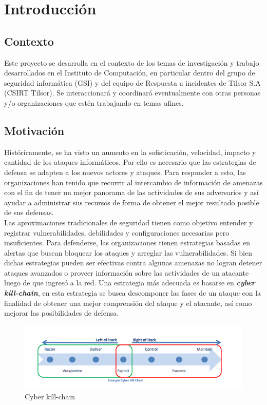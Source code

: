 \chapter{Introducción}
\label{capitulo1}
%

\section{Contexto}
\label{capitulo1:contexto}
Este proyecto se desarrolla en el contexto de los temas de investigación y trabajo desarrollados en el Instituto de Computación, en particular dentro del grupo de seguridad informática (GSI) y del equipo de Respuesta a incidentes de Tilsor S.A (CSIRT Tilsor). Se interaccionará y coordinará eventualmente con otras personas y/o organizaciones que estén trabajando en temas afines.

\section{Motivación}
\label{capitulo1:motivacion}
Históricamente, se ha visto un aumento en la sofisticación, velocidad, impacto y 
cantidad de los ataques informáticos. Por ello es necesario que las estrategias 
de defensa se adapten a los nuevos actores y ataques. Para responder a esto, las 
organizaciones han tenido que recurrir al intercambio de información de amenazas 
con el fin de tener un mejor panorama de las actividades de sus adversarios 
y así ayudar a administrar sus recursos de forma de obtener el mejor resultado 
posible de sus defensas. \\

Las aproximaciones tradicionales de seguridad tienen como objetivo entender y 
registrar vulnerabilidades, debilidades y configuraciones necesarias pero 
insuficientes. Para defenderse, las organizaciones tienen estrategias basadas en 
alertas que buscan bloquear los ataques y arreglar las vulnerabilidades. Si bien dichas estrategias pueden ser efectivas contra algunas 
amenazas no logran detener ataques avanzados o proveer información sobre las 
actividades de un atacante luego de que ingresó a la red. Una estrategia más 
adecuada es basarse en \textbf{\textit{cyber kill-chain}}, en esta estrategia se busca 
descomponer las fases de un ataque con la finalidad de obtener una mejor 
comprensión del ataque y el atacante, así como mejorar las posibilidades de 
defensa.

\begin{figure}[H]
  \centering
  \includegraphics[scale=0.55]{./images/killChain.png}
    \caption{Cyber kill-chain \protect\cite{b1}}
      \label{fig:kill_chain}
\end{figure}

